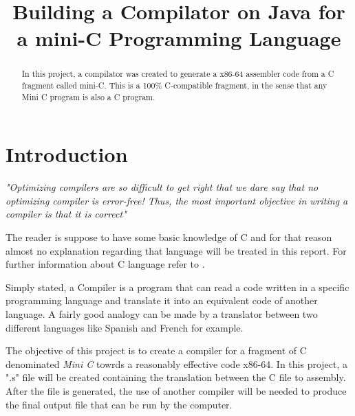 \documentclass[conference]{IEEEtran}
\theoremstyle{definition}
\begin{document}
\title{Building a Compilator on Java for a mini-C Programming Language}

\author{
\and
{}
}
\maketitle

\tableofcontents
\newpage

\begin{abstract}
In this project, a compilator was created to generate a x86-64 assembler code from a C fragment called mini-C.
This is a 100\% C-compatible fragment, in the sense that any Mini C program is also a C program.
\end{abstract}

\IEEEpeerreviewmaketitle

\section{Introduction}
\textit{"Optimizing compilers are so difficult to get right that we dare say that no optimizing compiler is error-free! Thus, the most important objective in writing a compiler is that it is correct"}\cite{DRAGON_BOOK}

The reader is suppose to have some basic knowledge of C and for that reason almost no explanation regarding that language will be treated in this report. For further information about C language refer to \cite{LANGUAGE_C}.

Simply stated, a Compiler is a program that can read a code written in a specific programming language and translate it into an equivalent code of another language. A fairly good analogy can be made by a translator between two different languages like Spanish and French for example.

The objective of this project is to create a compiler for a fragment of C denominated \textit{Mini C} towrds a reasonably effective code x86-64. In this project, a ".s" file will be created containing the translation between the C file to assembly. After the file is generated, the use of another compiler will be needed to produce the final output file that can be run by the computer.
\end{document}
